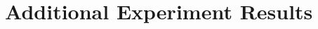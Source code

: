 \section{Additional Experiment Results}  \label{sec:appendix-more-experiments}



        
        
        
        
        
        
        
